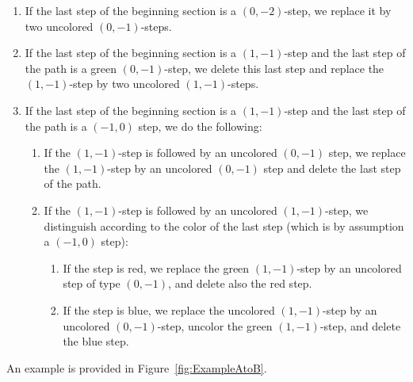 \documentclass[12pt]{amsart}
\theoremstyle{definition}
\numberwithin{equation}{section}
\begin{document}
\begin{enumerate}
	\item If the last step of the beginning section is a $(0,-2)$-step, we replace it by two uncolored $(0,-1)$-steps. \label{list:ABfirst}
	\item If the last step of the beginning section is a $(1,-1)$-step and the last step of the path is a green $(0,-1)$-step, we delete this last step and replace the $(1,-1)$-step by two uncolored $(1,-1)$-steps. \label{list:ABsecond}
	\item If the last step of the beginning section is a $(1,-1)$-step and the last step of the path is a $(-1,0)$ step, we do the following: 
	\begin{enumerate}
		\item If the $(1,-1)$-step is followed by an uncolored $(0,-1)$ step, we replace the $(1,-1)$-step by an uncolored 
		$(0,-1)$ step and delete the last step of the path.\label{list:ABthirda}
		\item If the $(1,-1)$-step is followed by an uncolored $(1,-1)$-step, we distinguish according to the color of the last step (which is by assumption a $(-1,0)$ step):
		\begin{enumerate} \item If the step is red, we replace the green $(1,-1)$-step by an uncolored step of type $(0,-1)$, and delete also the red step. \label{list:ABthirdb1}
			\item If the step is blue, we replace the uncolored $(1,-1)$-step by an uncolored $(0,-1)$-step, uncolor the green $(1,-1)$-step, and delete the blue step. \label{list:ABthirdb2}
		\end{enumerate}
	\end{enumerate} 
\end{enumerate} 
An example is provided in Figure~\ref{fig:ExampleAtoB}.
\end{document}
